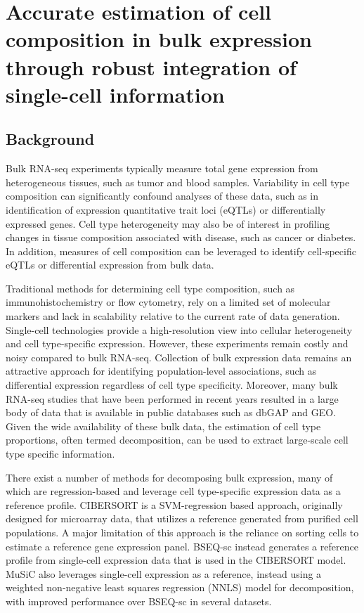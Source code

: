 \chapter{Accurate estimation of cell composition in bulk expression through robust integration of single-cell information}

\section{Background}

Bulk RNA-seq experiments typically measure total gene expression from heterogeneous tissues, such as tumor and blood samples\cite{Tomczak2015-kt,GTEx_Consortium2015-vl}. Variability in cell type composition can significantly confound analyses of these data, such as in identification of expression quantitative trait loci (eQTLs) or differentially expressed genes\cite{Bruning2016-vb}. Cell type heterogeneity may also be of interest in profiling changes in tissue composition associated with disease, such as cancer\cite{Fridman2012-bi} or diabetes\cite{Rahier1983-gh}. In addition, measures of cell composition can be leveraged to identify cell-specific eQTLs\cite{Shen-Orr2010-tg,Westra2015-vq} or differential expression\cite{Shen-Orr2010-tg} from bulk data. 

Traditional methods for determining cell type composition, such as immunohistochemistry or flow cytometry, rely on a limited set of molecular markers and lack in scalability relative to the current rate of data generation\cite{Hu2016-he}. Single-cell technologies provide a high-resolution view into cellular heterogeneity and cell type-specific expression\cite{Zheng2017-pq,Tasic2018-ue,Macosko2015-yn}. However, these experiments remain costly and noisy compared to bulk RNA-seq\cite{Wang2018-oj}. Collection of bulk expression data remains an attractive approach for identifying population-level associations, such as differential expression regardless of cell type specificity. Moreover, many bulk RNA-seq studies that have been performed in recent years resulted in a large body of data that is available in public databases such as dbGAP and GEO. Given the wide availability of these bulk data, the estimation of cell type proportions, often termed decomposition, can be used to extract large-scale cell type specific information.

There exist a number of methods for decomposing bulk expression, many of which are regression-based and leverage cell type-specific expression data as a reference profile\cite{Mohammadi2017-rw}. CIBERSORT\cite{Newman2015-iw} is a SVM-regression based approach, originally designed for microarray data, that utilizes a reference generated from purified cell populations. A major limitation of this approach is the reliance on sorting cells to estimate a reference gene expression panel. BSEQ-sc\cite{Baron2016-hb} instead generates a reference profile from single-cell expression data that is used in the CIBERSORT model. MuSiC\cite{Wang2019-lc} also leverages single-cell expression as a reference, instead using a weighted non-negative least squares regression (NNLS) model for decomposition, with improved performance over BSEQ-sc in several datasets.

